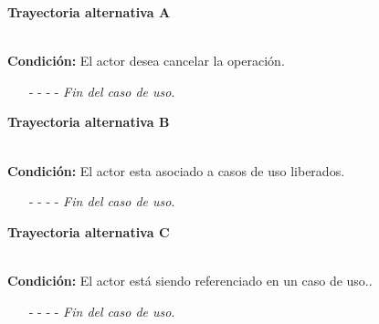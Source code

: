 \hypertarget{CU10-3:TAA}{\textbf{Trayectoria alternativa A}}\\
\noindent \textbf{Condición:} El actor desea cancelar la operación.
\begin{enumerate}
	\UCpaso[\UCactor] Oprime el botón  de la pantalla emergente.
	\UCpaso[\UCsist] Muestra la pantalla .
	\item[- -] - - {\em {Fin del caso de uso}}.%
\end{enumerate}	
\hypertarget{CU10-3:TAB}{\textbf{Trayectoria alternativa B}}\\
\noindent \textbf{Condición:} El actor esta asociado a casos de uso liberados.
\begin{enumerate}
	\UCpaso[\UCsist] Oculta el botón \eliminar del actor que esta asociado a casos de uso liberados.
	\item[- -] - - {\em {Fin del caso de uso}}.
\end{enumerate}
\hypertarget{CU10-3:TAC}{\textbf{Trayectoria alternativa C}}\\
\noindent \textbf{Condición:} El actor está siendo referenciado en un caso de uso..
\begin{enumerate}
	\UCpaso[\UCsist] Muestra el mensaje  en la pantalla  en una pantalla emergente con la lista de casos de uso que están referenciando al actor.
	\item[- -] - - {\em {Fin del caso de uso}}.
\end{enumerate}
